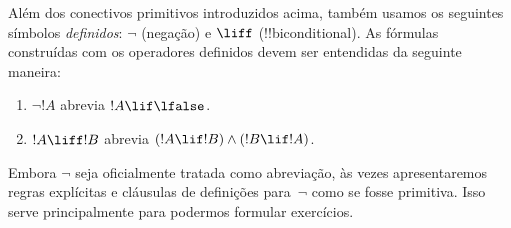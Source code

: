\documentclass[../../../include/open-logic-section]{subfiles}
\begin{document}
Além dos conectivos primitivos introduzidos acima, também usamos os
seguintes símbolos \emph{definidos}: $\lnot$ (negação) e $\liff$
(!!{biconditional}). As fórmulas construídas com os operadores definidos
devem ser entendidas da seguinte maneira:
\begin{enumerate}
\item $\lnot !A$ abrevia $!A \lif \lfalse$.

\item $!A \liff !B$ abrevia $(!A \lif !B) \land (!B
  \lif !A)$.
\end{enumerate}

Embora $\lnot$ seja oficialmente tratada como abreviação, às vezes
apresentaremos regras explícitas e cláusulas de definições para~$\lnot$
como se fosse primitiva. Isso serve principalmente para podermos
formular exercícios.
\end{document}

